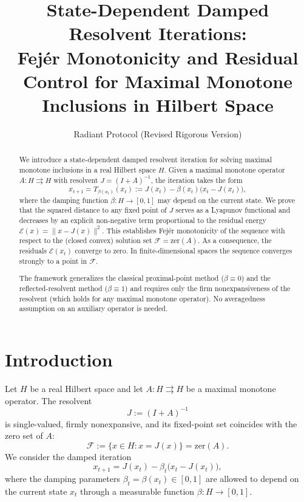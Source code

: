 \documentclass{article}
\title{State-Dependent Damped Resolvent Iterations:\\
Fejér Monotonicity and Residual Control for Maximal Monotone Inclusions in Hilbert Space}
\author{Radiant Protocol (Revised Rigorous Version)}
\date{}
\begin{document}
\maketitle

\begin{abstract}
We introduce a state-dependent damped resolvent iteration for solving maximal monotone inclusions in a real Hilbert space \(H\). Given a maximal monotone operator \(A: H \rightrightarrows H\) with resolvent \(J = (I + A)^{-1}\), the iteration takes the form
\[
x_{t+1} = T_{\beta(x_t)}(x_t) := J(x_t) - \beta(x_t) \bigl( x_t - J(x_t) \bigr),
\]
where the damping function \(\beta: H \to [0,1]\) may depend on the current state. We prove that the squared distance to any fixed point of \(J\) serves as a Lyapunov functional and decreases by an explicit non-negative term proportional to the residual energy \(\mathcal{E}(x) = \|x - J(x)\|^2\). This establishes Fejér monotonicity of the sequence with respect to the (closed convex) solution set \(\mathcal{F} = \mathrm{zer}(A)\). As a consequence, the residuals \(\mathcal{E}(x_t)\) converge to zero. In finite-dimensional spaces the sequence converges strongly to a point in \(\mathcal{F}\).

The framework generalizes the classical proximal-point method (\(\beta \equiv 0\)) and the reflected-resolvent method (\(\beta \equiv 1\)) and requires only the firm nonexpansiveness of the resolvent (which holds for any maximal monotone operator). No averagedness assumption on an auxiliary operator is needed.
\end{abstract}

\section{Introduction}

Let \(H\) be a real Hilbert space and let \(A: H \rightrightarrows H\) be a maximal monotone operator. The resolvent
\[
J := (I + A)^{-1}
\]
is single-valued, firmly nonexpansive, and its fixed-point set coincides with the zero set of \(A\):
\[
\mathcal{F} := \{ x \in H : x = J(x) \} = \mathrm{zer}(A).
\]
We consider the damped iteration
\[
x_{t+1} = J(x_t) - \beta_t \bigl( x_t - J(x_t) \bigr),
\]
where the damping parameters \(\beta_t = \beta(x_t) \in [0,1]\) are allowed to depend on the current state \(x_t\) through a measurable function \(\beta: H \to [0,1]\).
\end{document}
